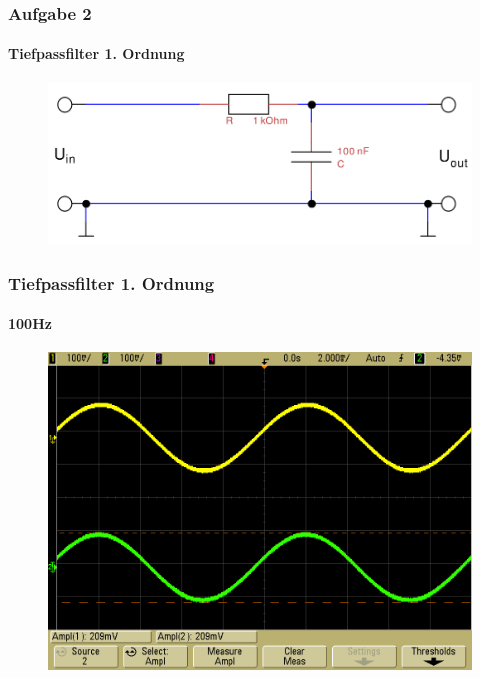 \begin{frame}
\frametitle{Aufgabe 2}
\framesubtitle{Tiefpassfilter 1. Ordnung}
\begin{figure}[H]
\begin{center}
        \includegraphics[scale=0.2]{./img/2a_bode_schaltbild.png}
\end{center}
\end{figure}
\end{frame}
\begin{frame}
    \frametitle{Tiefpassfilter 1. Ordnung}
    \framesubtitle{100Hz}
     \begin{figure}[H]
     \begin{center}
             \includegraphics[scale=0.2]{./img/2a_Tief_100Hz.png}
     \end{center}
     \end{figure}
\end{frame}

